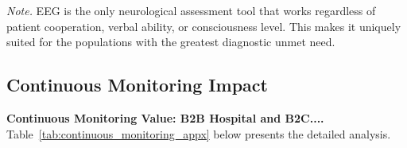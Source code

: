 \vspace{0.5em}\noindent\textit{Note.} EEG is the only neurological assessment tool that works regardless of patient cooperation, verbal ability, or consciousness level. This makes it uniquely suited for the populations with the greatest diagnostic unmet need.

\subsection{Continuous Monitoring Impact}

\noindent\textbf{Continuous Monitoring Value: B2B Hospital and B2C....} Table~\ref{tab:continuous_monitoring_appx} below presents the detailed analysis.

